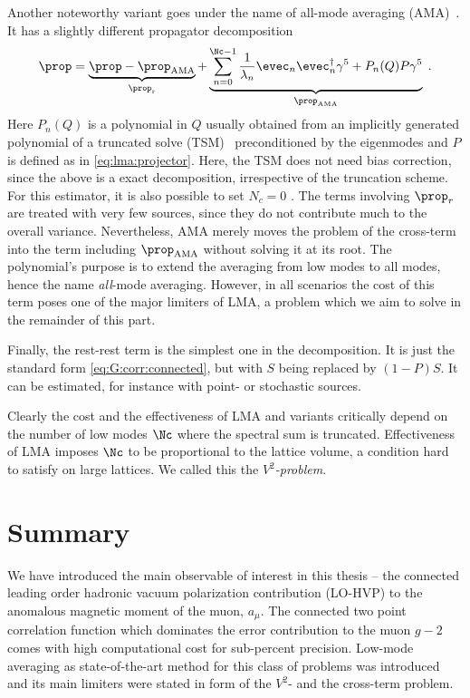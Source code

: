 Another noteworthy variant goes under the name of all-mode averaging (AMA)~\cite{Blum_2012,Blum_2015,CAA,RBC_2018}.
It has a slightly different propagator decomposition
\begin{equation}
\prop
= \underbrace{\prop - \prop_{\text{AMA}}}_{\prop_{\text{r}}}
+ \underbrace{\sum_{n=0}^{\Nc-1} \frac{1}{\lambda_n} \evec_n \evec_n^{\dagger} \gamma^{5}
+ P_n(Q) P \gamma^{5}}_{\prop_{\text{AMA}}} \;.
\end{equation}
Here $P_n(Q)$ is a polynomial in $Q$ usually obtained from an implicitly generated polynomial of a truncated solve (TSM)~\cite{Bali_2009} preconditioned by the eigenmodes and $P$ is defined as in \cref{eq:lma:projector}.
Here, the TSM does not need bias correction, since the above is a exact decomposition, irrespective of the truncation scheme.
For this estimator, it is also possible to set $N_c=0$ \cite{Blum_2012}.
The terms involving $\prop_{r}$ are treated with very few sources, since they do not contribute much to the overall variance.
Nevertheless, AMA merely moves the problem of the cross-term into the term including $\prop_{\text{AMA}}$ without solving it at its root.
The polynomial's purpose is to extend the averaging from low modes to all modes, hence the name \emph{all}-mode averaging.
However, in all scenarios the cost of this term poses one of the major limiters of LMA, a problem which we aim to solve in the remainder of this part.

Finally, the rest-rest term is the simplest one in the decomposition.
It is just the standard form \cref{eq:G:corr:connected}, but with $S$ being replaced by $(1-P)S$.
It can be estimated, for instance with point- or stochastic sources.

Clearly the cost and the effectiveness of LMA and variants critically depend on the number of low modes $\Nc$ where the spectral sum is truncated.
Effectiveness of LMA imposes $\Nc$ to be proportional to the lattice volume, a condition hard to satisfy on large lattices.
We called this the \emph{$V^{2}$-problem}.


\section{Summary}
\label{sec:2pt:summary}

We have introduced the main observable of interest in this thesis -- the connected leading order hadronic vacuum polarization contribution (LO-HVP) to the anomalous magnetic moment of the muon, $a_{\mu}$.
The connected two point correlation function which dominates the error contribution to the muon $g-2$ comes with high computational cost for sub-percent precision.
Low-mode averaging as state-of-the-art method for this class of problems was introduced and its main limiters were stated in form of the $V^{2}$- and the cross-term problem.

